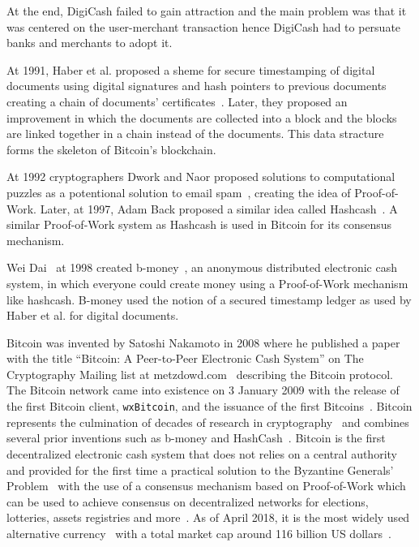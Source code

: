 At the end, DigiCash failed to gain attraction and the main problem was that it was centered on the user-merchant transaction hence
DigiCash had to persuate banks and merchants to adopt it.

At 1991, Haber et al. proposed a sheme for secure timestamping of digital documents using digital signatures and hash pointers to previous documents
creating a chain of documents' certificates~\cite{Haber1991}. Later, they proposed an improvement in which the documents are collected into a block and
the blocks are linked together in a chain instead of the documents. This data stracture forms the skeleton of Bitcoin's blockchain.

At 1992 cryptographers Dwork and Naor proposed solutions to computational puzzles as a potentional solution to email spam~\cite{Dwork1993},
creating the idea of Proof-of-Work. Later, at 1997, Adam Back proposed a similar idea called Hashcash~\cite{hash_cash}.
A similar Proof-of-Work system as Hashcash is used in Bitcoin for its consensus mechanism.

Wei Dai~\cite{bitcoin_wiki:wei_dai} at 1998 created b-money~\cite{bitcoin_wiki:b_money}, an anonymous distributed electronic cash system, in which everyone
could create money using a Proof-of-Work mechanism like hashcash. B-money used the notion of a secured timestamp ledger as used by Haber et al. for digital documents.

Bitcoin was invented by Satoshi Nakamoto in 2008 where he published a paper with the title ``Bitcoin: A Peer-to-Peer Electronic Cash System'' on The Cryptography Mailing list at metzdowd.com~\cite{satoshi_mailing_list} describing the Bitcoin protocol. The Bitcoin network came into existence on 3 January 2009 with the release of the first Bitcoin client, \verb|wxBitcoin|, and the issuance of the first Bitcoins~\cite{btc_client, btc_first_block}. Bitcoin represents the culmination of decades of research in cryptography~\cite{antonopoulos2014mastering} and combines several prior inventions such as b-money and HashCash~\cite{antonopoulos2014mastering}. Bitcoin is the first decentralized electronic cash system that does not relies on a central authority and
provided for the first time a practical solution to the Byzantine Generals' Problem~\cite{wiki:byzantine_fault_tolerance} with the use of a consensus mechanism
based on Proof-of-Work which can be used to achieve consensus on decentralized networks for elections, lotteries, assets registries and more~\cite{antonopoulos2014mastering}. As of April 2018, it is the most widely used alternative currency~\cite{10.1007/978-3-642-39884-1_2} with a total market cap around 116 billion US dollars~\cite{btc_cap}.

